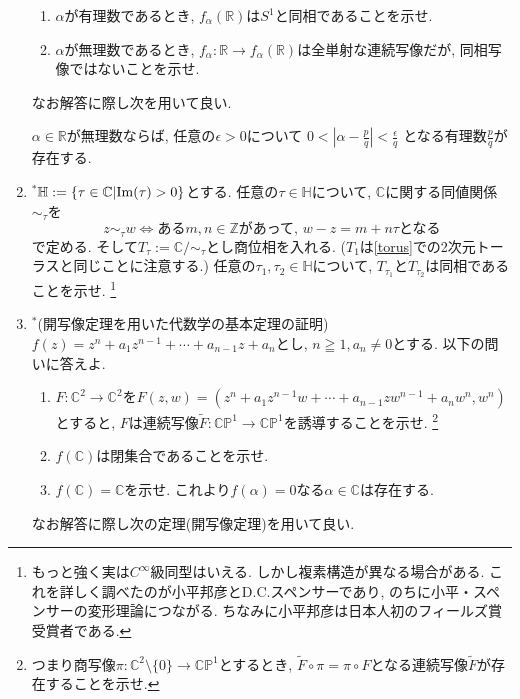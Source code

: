 \documentclass[dvipdfmx,a4paper,11pt]{article}
\newcommand{\R}{\mathbb{R}}
\newcommand{\Z}{\mathbb{Z}}
\newcommand{\C}{\mathbb{C}}
\theoremstyle{definition}
\begin{document}
\begin{enumerate}[label=\textbf{問}\ref*{sec-compact_continue}.\arabic*]
\begin{enumerate}
 \setlength{\parskip}{0cm}
  \setlength{\itemsep}{0pt} 
\item $\alpha$が有理数であるとき, $f_{\alpha}(\R) $は$S^1$と同相であることを示せ.
\item $\alpha$が無理数であるとき, $f_{\alpha}: \R \rightarrow f_{\alpha}(\R) $は全単射な連続写像だが, 同相写像ではないことを示せ. 
\end{enumerate}
なお解答に際し次を用いて良い.
 \begin{tcolorbox}[
    colback = white,
    colframe = green!35!black,
    fonttitle = \bfseries,
    breakable = true]
$\alpha \in \R$が無理数ならば, 任意の$\epsilon >0$について
$
0 < \left|\alpha - \frac{p}{q}\right| < \frac{\epsilon }{q}
$
となる有理数$\frac{p}{q}$が存在する.
 \end{tcolorbox}

\item $^{*}$\label{kodaira}$\mathbb{H} := \{ \tau \in \C | {\rm Im}(\tau)>0\}$とする.
 任意の$\tau \in \mathbb{H}$について, $\C$に関する同値関係$\sim_{\tau}$を
$$
z\sim_{\tau} w \Leftrightarrow \text{ある$m,n \in \Z$があって, $w-z = m+n\tau$となる}
$$
で定める. そして$T_{\tau} := \C/\sim_{\tau}$とし商位相を入れる. ($T_{1}$は\ref{torus}での2次元トーラスと同じことに注意する.)
 任意の$\tau_1, \tau_2 \in \mathbb{H}$について, $T_{\tau_1}$と$T_{\tau_2}$は同相であることを示せ. \footnote{もっと強く実は$C^{\infty}$級同型はいえる. しかし複素構造が異なる場合がある. これを詳しく調べたのが小平邦彦とD.C.スペンサーであり, のちに小平・スペンサーの変形理論につながる. ちなみに小平邦彦は日本人初のフィールズ賞受賞者である. }

\item \label{algebraic} $^{*}$(開写像定理を用いた代数学の基本定理の証明) $f(z) = z^n + a_1 z^{n-1}+ \cdots + a_{n-1}z + a_n$とし, $n \geqq 1, a_n \neq 0$とする.  以下の問いに答えよ.
   \begin{enumerate}
\setlength{\parskip}{0cm} 
  \setlength{\itemsep}{0cm} 
\item $F : \C^2 \rightarrow \C^2$を$F(z,w) = (z^n + a_1 z^{n-1}w+ \cdots +a_{n-1}zw^{n-1} + a_n w^n, w^n )$とすると, $F$は連続写像$\widetilde{F} : \C\mathbb{P}^{1} \to \C\mathbb{P}^{1} $を誘導することを示せ. \footnote{つまり商写像$\pi : \C^{2} \setminus \{0\}  \to \C\mathbb{P}^{1}$とするとき, $\widetilde{F} \circ \pi = \pi \circ F$となる連続写像$\widetilde{F}$が存在することを示せ.}
\item $f(\C)$は閉集合であることを示せ.
\item $f(\C)=\C$を示せ. これより$f(\alpha)=0$なる$\alpha \in \C$は存在する.
      \end{enumerate}  
なお解答に際し次の定理(開写像定理)を用いて良い.


\end{enumerate}
\end{document}
